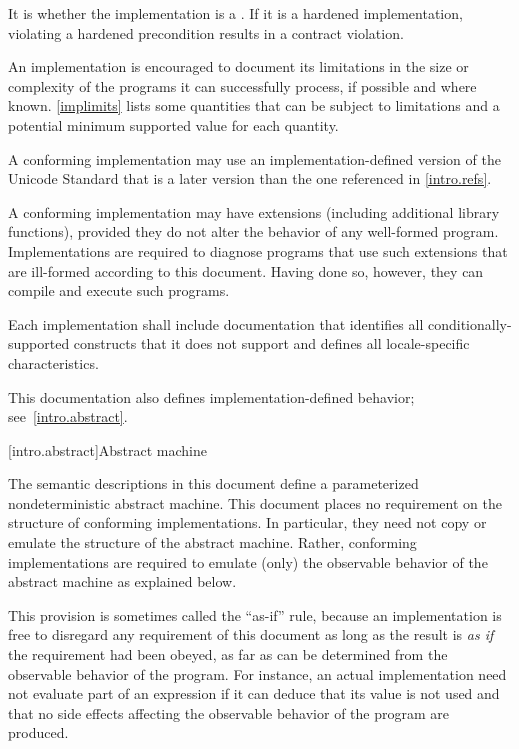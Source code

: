 \pnum
It is
whether the implementation is a
.
If it is a hardened implementation,
violating a hardened precondition
results in a contract violation.

\pnum
\recommended
An implementation is encouraged to document its limitations in
the size or complexity of the programs it can successfully process,
if possible and where known.
\ref{implimits} lists some quantities that can be subject to limitations and
a potential minimum supported value for each quantity.

\pnum
A conforming implementation may use an implementation-defined version
of the Unicode Standard that is a later version than the one
referenced in \ref{intro.refs}.

\pnum
A conforming implementation may have extensions (including
additional library functions), provided they do not alter the
behavior of any well-formed program.
Implementations are required to diagnose programs that use such
extensions that are ill-formed according to this document.
Having done so, however, they can compile and execute such programs.

\pnum
Each implementation shall include documentation that identifies all
conditionally-supported constructs
that it does not support and defines all locale-specific characteristics.
\begin{footnote}
This documentation also defines implementation-defined behavior;
see~\ref{intro.abstract}.
\end{footnote}
%
%

[intro.abstract]{Abstract machine}

\pnum
{}%
%
The semantic descriptions in this document define a
parameterized nondeterministic abstract machine. This document
places no requirement on the structure of conforming
implementations. In particular, they need not copy or emulate the
structure of the abstract machine.
%
%
Rather, conforming implementations are required to emulate (only) the observable
behavior of the abstract machine as explained below.
\begin{footnote}
This provision is
sometimes called the ``as-if'' rule, because an implementation is free to
disregard any requirement of this document as long as the result
is \emph{as if} the requirement had been obeyed, as far as can be determined
from the observable behavior of the program. For instance, an actual
implementation need not evaluate part of an expression if it can deduce that its
value is not used and that no
%
side effects affecting the
observable behavior of the program are produced.
\end{footnote}

